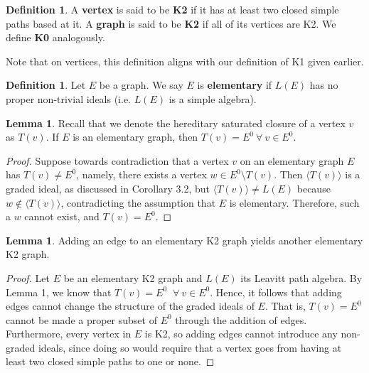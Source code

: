 \documentclass[12pt]{amsart}
\theoremstyle{plain} \numberwithin{equation}{section}
\theoremstyle{definition}
\newtheorem{lem}[theorem]{Lemma}
\newtheorem{definition}[theorem]{Definition}
\newcommand{\frall}{\:\forall\:}
\theoremstyle{definition}
\begin{document}
\begin{definition} A \textbf{vertex} is said to be \textbf{K2} if it has at least two closed simple paths based at it. A \textbf{graph} is said to be \textbf{K2} if all of its vertices are K2. We define \textbf{K0} analogously. 
\end{definition}

Note that on vertices, this definition aligns with our definition of K1 given earlier. 

\begin{definition}
    Let $E$ be a graph. We say $E$ is \textbf{elementary} if $L(E)$ has no proper non-trivial ideals (i.e. $L(E)$ is a simple algebra).
\end{definition}

\begin{lem}
    Recall that we denote the hereditary saturated closure of a vertex $v$ as $T(v)$. If $E$ is an elementary graph, then $T(v) = E^0 \frall v\in E^0$. 
\end{lem}
\begin{proof}
    Suppose towards contradiction that a vertex $v$ on an elementary graph $E$ has $T(v)\neq E^0$, namely, there exists a vertex $w\in E^0 \setminus T(v)$. Then $\langle T(v) \rangle$ is a graded ideal, as discussed in Corollary 3.2, but $\langle T(v) \rangle \neq L(E)$ because $w \notin \langle T(v) \rangle$, contradicting the assumption that $E$ is elementary. Therefore, such a $w$ cannot exist, and $T(v) = E^0$.
\end{proof}

\begin{lem}
    Adding an edge to an elementary K2 graph yields another elementary K2 graph. 
\end{lem}
\begin{proof}
    Let $E$ be an elementary K2 graph and $L(E)$ its Leavitt path algebra. By Lemma 1, we know that $T(v) = E^0$ $\frall v\in E^0$. Hence, it follows that adding edges cannot change the structure of the graded ideals of $E$. That is, $T(v) = E^0$ cannot be made a proper subset of $E^0$ through the addition of edges. Furthermore, every vertex in $E$ is K2, so adding edges cannot introduce any non-graded ideals, since doing so would require that a vertex goes from having at least two closed simple paths to one or none.
\end{proof}
\end{document}
